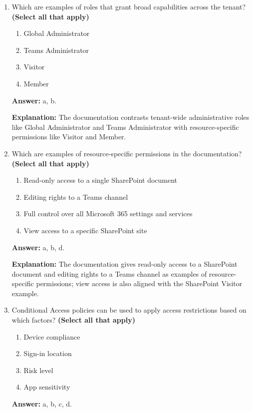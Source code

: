 \documentclass[10pt]{article}
\begin{document}
\begin{enumerate}[leftmargin=*]
\textbf{Explanation:} The documentation explicitly describes access and permissions in Microsoft 365 as layered and flexible.

\item Which are examples of roles that grant broad capabilities across the tenant? \textbf{(Select all that apply)}
\begin{enumerate}[label=\alph*., leftmargin=1.5em]
\item Global Administrator
\item Teams Administrator
\item Visitor
\item Member
\end{enumerate}
\textbf{Answer:} a, b.

\textbf{Explanation:} The documentation contrasts tenant-wide administrative roles like Global Administrator and Teams Administrator with resource-specific permissions like Visitor and Member.

\item Which are examples of resource-specific permissions in the documentation? \textbf{(Select all that apply)}
\begin{enumerate}[label=\alph*., leftmargin=1.5em]
\item Read-only access to a single SharePoint document
\item Editing rights to a Teams channel
\item Full control over all Microsoft 365 settings and services
\item View access to a specific SharePoint site
\end{enumerate}
\textbf{Answer:} a, b, d.

\textbf{Explanation:} The documentation gives read-only access to a SharePoint document and editing rights to a Teams channel as examples of resource-specific permissions; view access is also aligned with the SharePoint Visitor example.

\item Conditional Access policies can be used to apply access restrictions based on which factors? \textbf{(Select all that apply)}
\begin{enumerate}[label=\alph*., leftmargin=1.5em]
\item Device compliance
\item Sign-in location
\item Risk level
\item App sensitivity
\end{enumerate}
\textbf{Answer:} a, b, c, d.


\end{enumerate}
\end{document}
